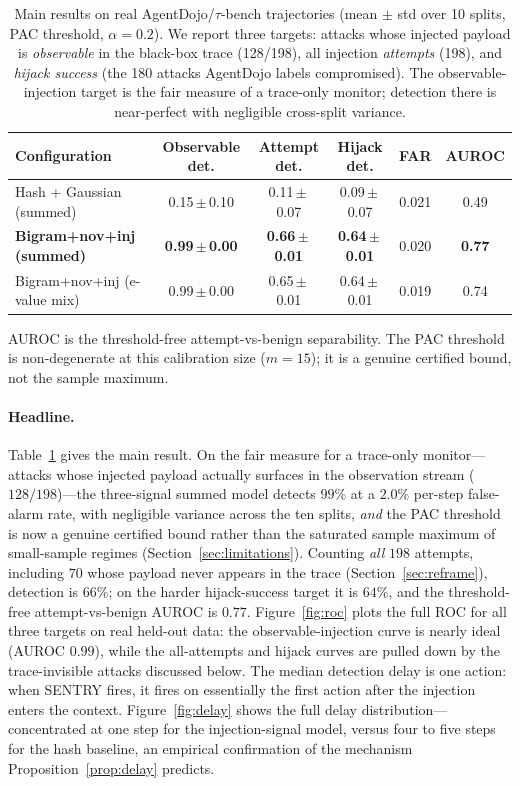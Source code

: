 \documentclass[10pt,journal,compsoc]{IEEEtran}
\newcommand{\botrule}{\bottomrule}
\theoremstyle{plain}
\theoremstyle{definition}
\begin{document}
\begin{table}[t]
\centering
\caption{Main results on real AgentDojo/$\tau$-bench trajectories
(mean \(\pm\) std over 10 splits, PAC threshold, \(\alpha=0.2\)). We report
three targets: attacks whose injected payload is \emph{observable} in the
black-box trace (128/198), all injection \emph{attempts} (198), and
\emph{hijack success} (the 180 attacks AgentDojo labels compromised). The
observable-injection target is the fair measure of a trace-only monitor;
detection there is near-perfect with negligible cross-split variance.}
\label{tab:main}
\begin{tabular}{@{}lccccc@{}}
\toprule
Configuration & Observable det. & Attempt det. & Hijack det. & FAR & AUROC \\
\midrule
Hash + Gaussian (summed)          & 0.15\,$\pm$\,0.10 & 0.11\,$\pm$\,0.07 & 0.09\,$\pm$\,0.07 & 0.021 & 0.49 \\
\textbf{Bigram+nov+inj (summed)}  & \textbf{0.99\,$\pm$\,0.00} & \textbf{0.66\,$\pm$\,0.01} & \textbf{0.64\,$\pm$\,0.01} & 0.020 & \textbf{0.77} \\
Bigram+nov+inj (e-value mix)      & 0.99\,$\pm$\,0.00 & 0.65\,$\pm$\,0.01 & 0.64\,$\pm$\,0.01 & 0.019 & 0.74 \\
\botrule
\end{tabular}
\vspace{3pt}

{\footnotesize AUROC is the threshold-free attempt-vs-benign separability. The
PAC threshold is non-degenerate at this calibration size (\(m=15\)); it is a
genuine certified bound, not the sample maximum.}
\end{table}

\paragraph{Headline.} Table~\ref{tab:main} gives the main result. On the fair
measure for a trace-only monitor---attacks whose injected payload actually
surfaces in the observation stream (\(128/198\))---the three-signal summed model
detects \(99\%\) at a \(2.0\%\) per-step false-alarm rate, with negligible
variance across the ten splits, \emph{and} the PAC threshold is now a genuine
certified bound rather than the saturated sample maximum of small-sample
regimes (Section~\ref{sec:limitations}). Counting \emph{all} \(198\) attempts,
including \(70\) whose payload never appears in the trace
(Section~\ref{sec:reframe}), detection is \(66\%\); on the harder
hijack-success target it is \(64\%\), and the threshold-free attempt-vs-benign
AUROC is \(0.77\). Figure~\ref{fig:roc} plots the full ROC for all three
targets on real held-out data: the observable-injection curve is nearly
ideal (AUROC \(0.99\)), while the all-attempts and hijack curves are pulled
down by the trace-invisible attacks discussed below. The median detection
delay is one action: when SENTRY fires,
it fires on essentially the first action after the injection enters the
context. Figure~\ref{fig:delay} shows the full delay distribution---
concentrated at one step for the injection-signal model, versus four to five
steps for the hash baseline, an empirical confirmation of the mechanism
Proposition~\ref{prop:delay} predicts.
\end{document}
